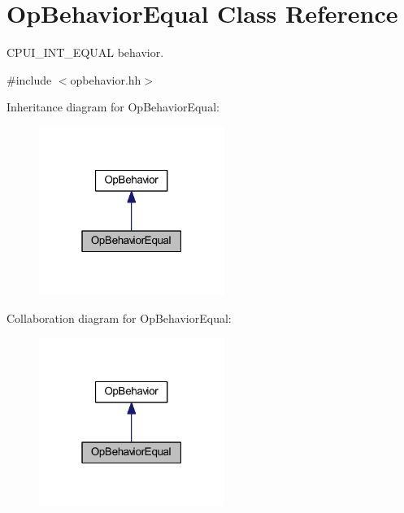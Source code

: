 \hypertarget{class_op_behavior_equal}{}\section{Op\+Behavior\+Equal Class Reference}
\label{class_op_behavior_equal}


C\+P\+U\+I\+\_\+\+I\+N\+T\+\_\+\+E\+Q\+U\+AL behavior.  




{\ttfamily \#include $<$opbehavior.\+hh$>$}



Inheritance diagram for Op\+Behavior\+Equal\+:
\nopagebreak
\begin{figure}[H]
\begin{center}
\leavevmode
\includegraphics[width=171pt]{class_op_behavior_equal__inherit__graph}
\end{center}
\end{figure}


Collaboration diagram for Op\+Behavior\+Equal\+:
\nopagebreak
\begin{figure}[H]
\begin{center}
\leavevmode
\includegraphics[width=171pt]{class_op_behavior_equal__coll__graph}
\end{center}
\end{figure}
